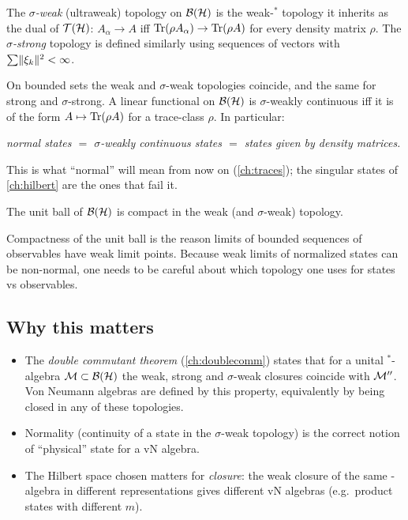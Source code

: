 \begin{definition}
The \emph{$\sigma$-weak} (ultraweak) topology on $\mathcal{B}(\mathcal{H})$ is the weak-$^*$ topology it inherits as the dual of $\mathcal T(\mathcal{H})$: $A_\alpha\to A$ iff $\operatorname{Tr}(\rho A_\alpha)\to\operatorname{Tr}(\rho A)$ for every density matrix $\rho$. The \emph{$\sigma$-strong} topology is defined similarly using sequences of vectors with $\sum\lVert \xi_k\rVert^2<\infty$.
\end{definition}
On bounded sets the weak and $\sigma$-weak topologies coincide, and the same for strong and $\sigma$-strong. A linear functional on $\mathcal{B}(\mathcal{H})$ is $\sigma$-weakly continuous iff it is of the form $A\mapsto\operatorname{Tr}(\rho A)$ for a trace-class $\rho$. In particular:

\begin{center}
\emph{normal states $=$ $\sigma$-weakly continuous states $=$ states given by density matrices.}
\end{center}
This is what ``normal'' will mean from now on (\cref{ch:traces}); the singular states of \cref{ch:hilbert} are the ones that fail it.

\begin{theorem}
The unit ball of $\mathcal{B}(\mathcal{H})$ is compact in the weak (and $\sigma$-weak) topology.
\end{theorem}
Compactness of the unit ball is the reason limits of bounded sequences of observables have weak limit points. Because weak limits of normalized states can be non-normal, one needs to be careful about which topology one uses for states vs observables.

\subsection{Why this matters}

\begin{itemize}
\item The \emph{double commutant theorem} (\cref{ch:doublecomm}) states that for a unital $^*$-algebra $\mathcal{M}\subset\mathcal{B}(\mathcal{H})$ the weak, strong and $\sigma$-weak closures coincide with $\mathcal{M}''$. Von Neumann algebras are defined by this property, equivalently by being closed in any of these topologies.
\item Normality (continuity of a state in the $\sigma$-weak topology) is the correct notion of ``physical'' state for a vN algebra.
\item The Hilbert space chosen matters for \emph{closure}: the weak closure of the same \cstar-algebra in different representations gives different vN algebras (e.g.\ product states with different $m$).
\end{itemize}

